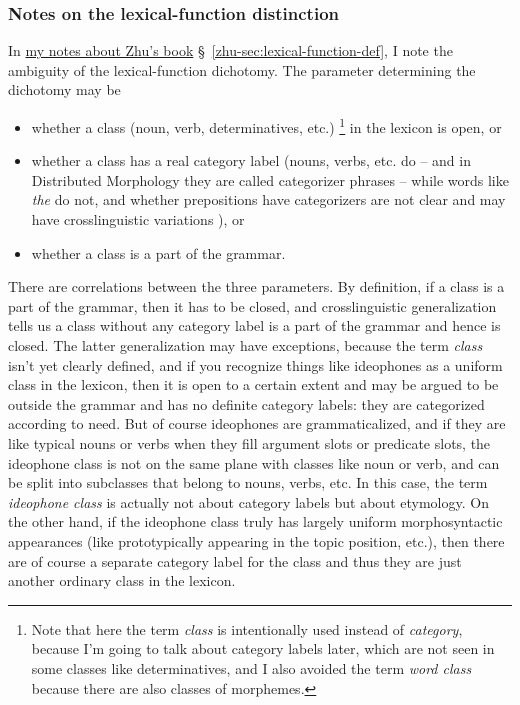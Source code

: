 \documentclass[UTF8, a4paper, oneside, scheme=plain]{ctexart}
\newcommand*{\citesec}[1]{\S~{#1}}
\newcommand*{\term}[1]{\emph{#1}}
\newcommand*{\corpus}[1]{\emph{#1}}
\newcommand{\zhudexi}{\href{../Chinese/reading-note-zhudexi.pdf}{my notes about Zhu's book}}
\begin{document}
\subsubsection{Notes on the lexical-function distinction}\label{sec:lexical-function-distinction}

In \zhudexi{} \citesec{\ref{zhu-sec:lexical-function-def}},
I note the ambiguity of the lexical-function dichotomy.
The parameter determining the dichotomy may be  
\begin{itemize}
    \item whether a class (noun, verb, determinatives, etc.)%
    \footnote{
        Note that here the term \term{class} is intentionally used instead of \term{category}, 
        because I'm going to talk about category labels later, 
        which are not seen in some classes like determinatives,
        and I also avoided the term \term{word class} because there are also classes of morphemes.
    }
    in the lexicon is open, or 
    \item whether a class has a real category label
    (nouns, verbs, etc. do -- and in Distributed Morphology they are called categorizer phrases -- 
    while words like \corpus{the} do not, and
    whether prepositions have categorizers are not clear
    and may have crosslinguistic variations \citep{deacon2014adpositions}), or 
    \item whether a class is a part of the grammar.
\end{itemize}
There are correlations between the three parameters.
By definition, if a class is a part of the grammar,
then it has to be closed,
and crosslinguistic generalization tells us 
a class without any category label is a part of the grammar 
and hence is closed.
The latter generalization may have exceptions,
because the term \term{class} isn't yet clearly defined,
and if you recognize things like ideophones as a uniform class in the lexicon,
then it is open to a certain extent 
and may be argued to be outside the grammar and has no definite category labels:
they are categorized according to need.
But of course ideophones are grammaticalized,
and if they are like typical nouns or verbs when they fill argument slots or predicate slots,
the ideophone class is not on the same plane with classes like noun or verb,
and can be split into subclasses that belong to nouns, verbs, etc.
In this case, the term \term{ideophone class} 
is actually not about category labels but about etymology.
On the other hand,
if the ideophone class truly has largely uniform morphosyntactic appearances
(like prototypically appearing in the topic position, etc.),
then there are of course a separate category label for the class 
and thus they are just another ordinary class in the lexicon.
\end{document}
